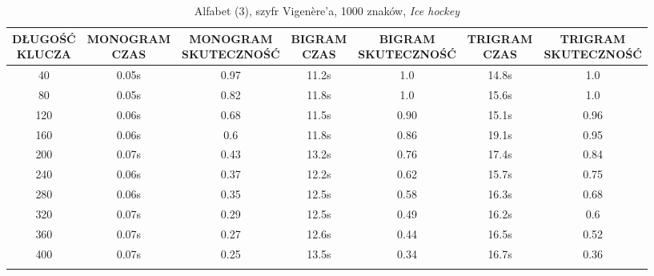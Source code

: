 \documentclass[a4paper]{article}
\theoremstyle{defn}
\theoremstyle{theorem}
\theoremstyle{lemma}
\theoremstyle{cor}
\theoremstyle{fact}
\begin{document}
\begin{center}\begin{small}\begin{longtable}{|c|c|c|c|c|c|c|}
\hline \makecell{DŁUGOŚĆ\\KLUCZA} &  \makecell{MONOGRAM\\CZAS} & \makecell{MONOGRAM\\SKUTECZNOŚĆ} & \makecell{BIGRAM\\CZAS} &  \makecell{BIGRAM\\SKUTECZNOŚĆ} & \makecell{TRIGRAM\\CZAS} & \makecell{TRIGRAM\\SKUTECZNOŚĆ}\\ \hline
40 & 0.05s & 0.97 & 11.2s & 1.0 & 14.8s & 1.0 \\ \hline
80 & 0.05s & 0.82 & 11.8s & 1.0 & 15.6s & 1.0 \\ \hline
120 & 0.06s & 0.68 & 11.5s & 0.90 & 15.1s & 0.96 \\ \hline
160 & 0.06s & 0.6 & 11.8s & 0.86 & 19.1s & 0.95 \\ \hline
200 & 0.07s & 0.43 & 13.2s & 0.76 & 17.4s & 0.84 \\ \hline
240 & 0.06s & 0.37 & 12.2s & 0.62 & 15.7s & 0.75 \\ \hline
280 & 0.06s & 0.35 & 12.5s & 0.58 & 16.3s & 0.68 \\ \hline
320 & 0.07s & 0.29 & 12.5s & 0.49 & 16.2s & 0.6 \\ \hline
360 & 0.07s & 0.27 & 12.6s & 0.44 & 16.5s & 0.52 \\ \hline
400 & 0.07s & 0.25 & 13.5s & 0.34 & 16.7s & 0.36 \\ \hline
\caption{Alfabet (3), szyfr Vigenère'a, 1000 znaków, \textit{Ice hockey}}
\end{longtable}\end{small}\end{center}
\end{document}
